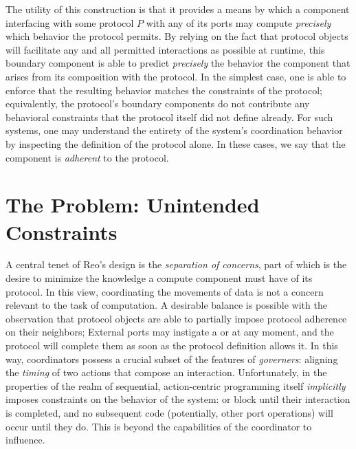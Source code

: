 The utility of this construction is that it provides a means by which a component interfacing with some protocol $P$ with any of its ports may compute \textit{precisely} which behavior the protocol permits. By relying on the fact that protocol objects will facilitate any and all permitted interactions as possible at runtime, this boundary component is able to predict \textit{precisely} the behavior the component that arises from its composition with the protocol. In the simplest case, one is able to enforce that the resulting behavior matches the constraints of the protocol; equivalently, the protocol's boundary components do not contribute any behavioral constraints that the protocol itself did not define already. For such systems, one may understand the entirety of the system's coordination behavior by inspecting the definition of the protocol alone. In these cases, we say that the component is \textit{adherent} to the protocol.

\section{The Problem: Unintended Constraints}
\label{sec:unintended_constraints}
A central tenet of Reo's design is the \textit{separation of concerns}, part of which is the desire to minimize the knowledge a compute component must have of its protocol. In this view, coordinating the movements of data is not a concern relevant to the task of computation. A desirable balance is possible with the observation that protocol objects are able to partially impose protocol adherence on their neighbors; External ports may instigate a  or  at any moment, and the protocol will complete them as soon as the protocol definition allows it. In this way, coordinators possess a crucial subset of the features of \textit{governers}: aligning the \textit{timing} of two actions that compose an interaction. Unfortunately, in the properties of the realm of sequential, action-centric programming itself \textit{implicitly} imposes constraints on the behavior of the system:  or  block until their interaction is completed, and no subsequent code (potentially, other port operations) will occur until they do. This is beyond the capabilities of the coordinator to influence.

